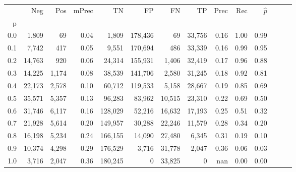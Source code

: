 \begin{tabular}{rrrrrrrrrrrrrr}
\toprule
{} &     Neg &    Pos & mPrec &       TN &       FP &      FN &      TP &  Prec &   Rec & $\hat{p}$ \\
p   &         &        &       &          &          &         &         &       &       &           \\
\midrule
0.0 &   1,809 &     69 &  0.04 &    1,809 &  178,436 &      69 &  33,756 &  0.16 &  1.00 &      0.99 \\
0.1 &   7,742 &    417 &  0.05 &    9,551 &  170,694 &     486 &  33,339 &  0.16 &  0.99 &      0.95 \\
0.2 &  14,763 &    920 &  0.06 &   24,314 &  155,931 &   1,406 &  32,419 &  0.17 &  0.96 &      0.88 \\
0.3 &  14,225 &  1,174 &  0.08 &   38,539 &  141,706 &   2,580 &  31,245 &  0.18 &  0.92 &      0.81 \\
0.4 &  22,173 &  2,578 &  0.10 &   60,712 &  119,533 &   5,158 &  28,667 &  0.19 &  0.85 &      0.69 \\
0.5 &  35,571 &  5,357 &  0.13 &   96,283 &   83,962 &  10,515 &  23,310 &  0.22 &  0.69 &      0.50 \\
0.6 &  31,746 &  6,117 &  0.16 &  128,029 &   52,216 &  16,632 &  17,193 &  0.25 &  0.51 &      0.32 \\
0.7 &  21,928 &  5,614 &  0.20 &  149,957 &   30,288 &  22,246 &  11,579 &  0.28 &  0.34 &      0.20 \\
0.8 &  16,198 &  5,234 &  0.24 &  166,155 &   14,090 &  27,480 &   6,345 &  0.31 &  0.19 &      0.10 \\
0.9 &  10,374 &  4,298 &  0.29 &  176,529 &    3,716 &  31,778 &   2,047 &  0.36 &  0.06 &      0.03 \\
1.0 &   3,716 &  2,047 &  0.36 &  180,245 &        0 &  33,825 &       0 &   nan &  0.00 &      0.00 \\
\bottomrule
\end{tabular}
